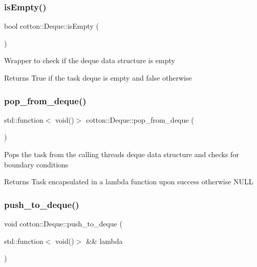 \subsubsection{\texorpdfstring{is\+Empty()}{isEmpty()}}
{\footnotesize\ttfamily bool cotton\+::\+Deque\+::is\+Empty (\begin{DoxyParamCaption}{ }\end{DoxyParamCaption})}

Wrapper to check if the deque data structure is empty

\begin{DoxyReturn}{Returns}
True if the task deque is empty and false otherwise 
\end{DoxyReturn}
\mbox{\label{structcotton_1_1Deque_a3ed7ee8c99eb531a0a0f769453c7e0d8}} 
\subsubsection{\texorpdfstring{pop\+\_\+from\+\_\+deque()}{pop\_from\_deque()}}
{\footnotesize\ttfamily std\+::function$<$ void()$>$ cotton\+::\+Deque\+::pop\+\_\+from\+\_\+deque (\begin{DoxyParamCaption}{ }\end{DoxyParamCaption})}

Pops the task from the calling thread\textquotesingle{}s deque data structure and checks for boundary conditions

\begin{DoxyReturn}{Returns}
Task encapsulated in a lambda function upon success otherwise N\+U\+LL 
\end{DoxyReturn}
\mbox{\label{structcotton_1_1Deque_a25b82cdb2dedb264c91301a050990203}} 
\subsubsection{\texorpdfstring{push\+\_\+to\+\_\+deque()}{push\_to\_deque()}}
{\footnotesize\ttfamily void cotton\+::\+Deque\+::push\+\_\+to\+\_\+deque (\begin{DoxyParamCaption}\item[{std\+::function$<$ void()$>$ \&\&}]{lambda }\end{DoxyParamCaption})}

